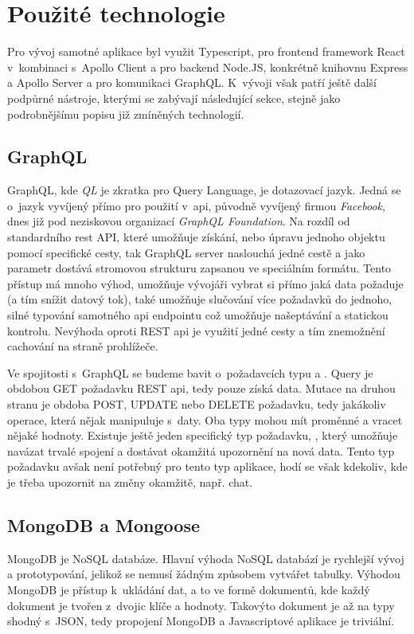 \section{Použité technologie}
\label{sc:used_techologies}
Pro vývoj samotné aplikace byl využit Typescript, pro frontend framework React v~kombinaci s~Apollo Client a pro backend Node.JS, konkrétně knihovnu Express a Apollo Server a pro komunikaci GraphQL. K~vývoji však patří ještě další podpůrné nástroje, kterými se zabývají následující sekce, stejně jako podrobnějšímu popisu již zmíněných technologií.

\subsection{GraphQL}
\label{ss:graphql}
GraphQL, kde \emph{QL} je zkratka pro Query Language, je dotazovací jazyk. Jedná se o~jazyk vyvíjený přímo pro použití v~\acrshort{api}, původně vyvíjený firmou \emph{Facebook}, dnes již pod neziskovou organizací \emph{GraphQL Foundation}. Na rozdíl od standardního \acrshort{rest} API, které umožňuje získání, nebo úpravu jednoho objektu pomocí specifické cesty, tak GraphQL server naslouchá jedné cestě a jako parametr dostává stromovou strukturu zapsanou ve speciálním formátu. Tento přístup má mnoho výhod, umožňuje vývojáři vybrat si přímo jaká data požaduje (a tím snížit datový tok), také umožňuje slučování více požadavků do jednoho, silné typování samotného \acrshort{api} endpointu což umožňuje našeptávání a statickou kontrolu. Nevýhoda oproti REST \acrshort{api} je využití jedné cesty a tím znemožnění cachování na straně prohlížeče. \cite{brito2020rest}

Ve spojitosti s~GraphQL se budeme bavit o~požadavcích typu  a . Query je obdobou GET požadavku REST \acrshort{api}, tedy pouze získá data. Mutace na druhou stranu je obdoba POST, UPDATE nebo DELETE požadavku, tedy jakákoliv operace, která nějak manipuluje s~daty. Oba typy mohou mít proměnné a vracet nějaké hodnoty. Existuje ještě jeden specifický typ požadavku, , který umožňuje navázat trvalé spojení a dostávat okamžitá upozornění na nová data. Tento typ požadavku avšak není potřebný pro tento typ aplikace, hodí se však kdekoliv, kde je třeba upozornit na změny okamžitě, např. chat. \cite{porcello_2018_learning}

\subsection{MongoDB a Mongoose}
\label{ss:mongoose}
MongoDB je NoSQL databáze. Hlavní výhoda NoSQL databází je rychlejší vývoj a prototypování, jelikož se nemusí žádným způsobem vytvářet tabulky. Výhodou MongoDB je přístup k~ukládání dat, a to ve formě dokumentů, kde každý dokument je tvořen z~dvojic klíče a hodnoty. Takovýto dokument je až na typy shodný s~JSON, tedy propojení MongoDB a Javascriptové aplikace je triviální.

